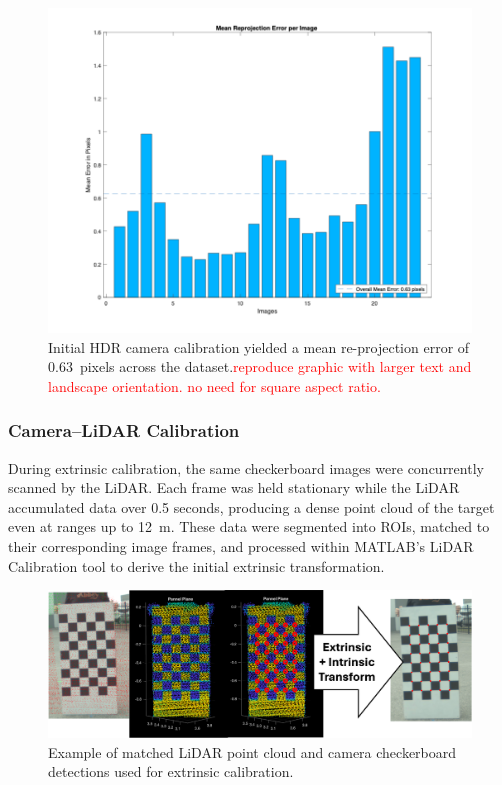 \documentclass[../main.tex]{subfiles}
\begin{document}
\begin{figure}[htbp]
    \centering
    \includegraphics[width=0.9\linewidth]{Images/HDR_calib_error.png}
    \caption{Initial HDR camera calibration yielded a mean re-projection error of 0.63~pixels across the dataset.\textcolor{red}{reproduce graphic with larger text and landscape orientation. no need for square aspect ratio.}}
    \label{fig:HDR_calib_error}
\end{figure}

\subsubsection{Camera–LiDAR Calibration} \label{sec:camera-lidar_results}

During extrinsic calibration, the same checkerboard images were concurrently scanned by the LiDAR.  
Each frame was held stationary while the LiDAR accumulated data over 0.5 seconds, producing a dense point cloud of the target even at ranges up to 12~m.  
These data were segmented into \acp{ROI}, matched to their corresponding image frames, and processed within MATLAB’s LiDAR Calibration tool \cite{matlab_calibration} to derive the initial extrinsic transformation.

\begin{figure}[htbp]
    \centering
    \includegraphics[width=0.8\linewidth]{Images/calib_checkers.png}
    \caption{Example of matched LiDAR point cloud and camera checkerboard detections used for extrinsic calibration.}
    \label{fig:calib_check}
\end{figure}
\end{document}
